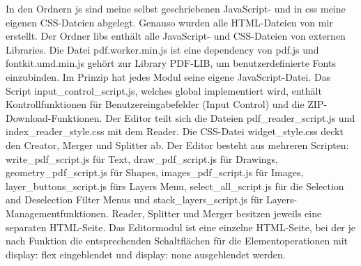 In den Ordnern js sind meine selbst geschriebenen JavaScript- und in css meine eigenen CSS-Dateien abgelegt. Genauso wurden alle HTML-Dateien von mir erstellt. Der Ordner libs enthält alle JavaScript- und CSS-Dateien von externen Libraries. Die Datei pdf.worker.min.js ist eine dependency von pdf.js und fontkit.umd.min.js gehört zur Library PDF-LIB, um benutzerdefinierte Fonts einzubinden. Im Prinzip hat jedes Modul seine eigene JavaScript-Datei. Das Script input\_control\_script.js, welches global implementiert wird, enthält Kontrollfunktionen für Benutzereingabefelder (Input Control) und die ZIP-Download-Funktionen. Der Editor teilt sich die Dateien pdf\_reader\_script.js und index\_reader\_style.css mit dem Reader. Die CSS-Datei widget\_style.css deckt den Creator, Merger und Splitter ab. Der Editor besteht aus mehreren Scripten: write\_pdf\_script.js für Text, draw\_pdf\_script.js für Drawings, geometry\_pdf\_script.js für Shapes, images\_pdf\_script.js für Images, layer\_buttons\_script.js fürs Layers Menu, select\_all\_script.js für die Selection and Deselection Filter Menus und stack\_layers\_script.js für Layers-Managementfunktionen. Reader, Splitter und Merger besitzen jeweils eine separaten HTML-Seite. Das Editormodul ist eine einzelne HTML-Seite, bei der je nach Funktion die entsprechenden Schaltflächen für die Elementoperationen mit display: flex eingeblendet und display: none ausgeblendet werden. 

